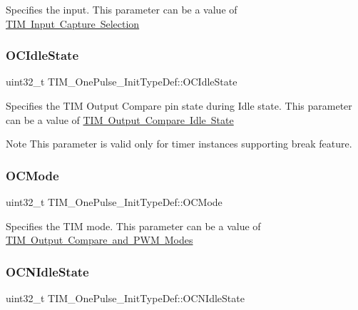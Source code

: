 Specifies the input. This parameter can be a value of \mbox{\hyperlink{group___t_i_m___input___capture___selection}{T\+IM Input Capture Selection}} \mbox{\label{struct_t_i_m___one_pulse___init_type_def_aef11bcea1dbf3e3ddf2a4bbc2846bb1e}} 
\subsubsection{\texorpdfstring{OCIdleState}{OCIdleState}}
{\footnotesize\ttfamily uint32\+\_\+t T\+I\+M\+\_\+\+One\+Pulse\+\_\+\+Init\+Type\+Def\+::\+O\+C\+Idle\+State}

Specifies the T\+IM Output Compare pin state during Idle state. This parameter can be a value of \mbox{\hyperlink{group___t_i_m___output___compare___idle___state}{T\+IM Output Compare Idle State}} \begin{DoxyNote}{Note}
This parameter is valid only for timer instances supporting break feature. 
\end{DoxyNote}
\mbox{\label{struct_t_i_m___one_pulse___init_type_def_af127f01162853e39ae616b43cc52b674}} 
\subsubsection{\texorpdfstring{OCMode}{OCMode}}
{\footnotesize\ttfamily uint32\+\_\+t T\+I\+M\+\_\+\+One\+Pulse\+\_\+\+Init\+Type\+Def\+::\+O\+C\+Mode}

Specifies the T\+IM mode. This parameter can be a value of \mbox{\hyperlink{group___t_i_m___output___compare__and___p_w_m__modes}{T\+IM Output Compare and P\+WM Modes}} \mbox{\label{struct_t_i_m___one_pulse___init_type_def_a37bc0a680d53458bf4c42ebb277b0c2c}} 
\subsubsection{\texorpdfstring{OCNIdleState}{OCNIdleState}}
{\footnotesize\ttfamily uint32\+\_\+t T\+I\+M\+\_\+\+One\+Pulse\+\_\+\+Init\+Type\+Def\+::\+O\+C\+N\+Idle\+State}

